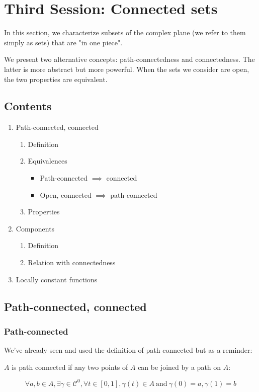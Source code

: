 \section{Third Session: Connected sets}
In this section, we characterize subsets of the complex plane (we refer to them simply as sets) that are "in one piece".

We present two alternative concepts: path-connectedness and connectedness. The latter is more abstract but more powerful. When the sets we consider are open, the two properties are equivalent.

\subsection*{Contents}
\begin{enumerate}
    \item Path-connected, connected
        \begin{enumerate}
            \item Definition
            \item Equivalences
                \begin{itemize}
                    \item Path-connected $\implies$ connected
                    \item Open, connected $\implies$ path-connected 
                \end{itemize}
            \item Properties
        \end{enumerate}
    \item Components
        \begin{enumerate}
            \item Definition
            \item Relation with connectedness
        \end{enumerate}
    \item Locally constant functions
\end{enumerate}

\subsection{Path-connected, connected}

\subsubsection{Path-connected}
We've already seen and used the definition of path connected but as a reminder:
\begin{defi}
   $A$ is path connected if any two points of $A$ can be joined by a path on $A$:

   $$\forall a,b\in A, \exists \gamma\in\mathcal{C}^0, \forall t\in[0,1], \gamma(t)\in A~\mathrm{ and}~\gamma(0) = a, \gamma(1) = b$$
\end{defi}

